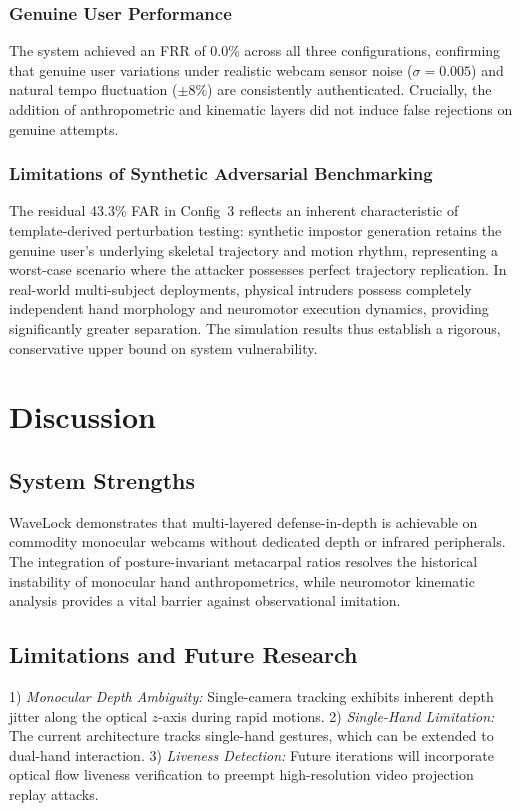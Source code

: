 \documentclass[conference]{IEEEtran}
\begin{document}
\subsubsection{Genuine User Performance}
The system achieved an FRR of 0.0\% across all three configurations, confirming that genuine user variations under realistic webcam sensor noise ($\sigma = 0.005$) and natural tempo fluctuation ($\pm 8\%$) are consistently authenticated. Crucially, the addition of anthropometric and kinematic layers did not induce false rejections on genuine attempts.

\subsubsection{Limitations of Synthetic Adversarial Benchmarking}
The residual 43.3\% FAR in Config~3 reflects an inherent characteristic of template-derived perturbation testing: synthetic impostor generation retains the genuine user's underlying skeletal trajectory and motion rhythm, representing a worst-case scenario where the attacker possesses perfect trajectory replication. In real-world multi-subject deployments, physical intruders possess completely independent hand morphology and neuromotor execution dynamics, providing significantly greater separation. The simulation results thus establish a rigorous, conservative upper bound on system vulnerability.

\section{Discussion}
\label{sec:discussion}

\subsection{System Strengths}
WaveLock demonstrates that multi-layered defense-in-depth is achievable on commodity monocular webcams without dedicated depth or infrared peripherals. The integration of posture-invariant metacarpal ratios resolves the historical instability of monocular hand anthropometrics, while neuromotor kinematic analysis provides a vital barrier against observational imitation.

\subsection{Limitations and Future Research}
1) \textit{Monocular Depth Ambiguity:} Single-camera tracking exhibits inherent depth jitter along the optical $z$-axis during rapid motions.
2) \textit{Single-Hand Limitation:} The current architecture tracks single-hand gestures, which can be extended to dual-hand interaction.
3) \textit{Liveness Detection:} Future iterations will incorporate optical flow liveness verification to preempt high-resolution video projection replay attacks.
\end{document}
